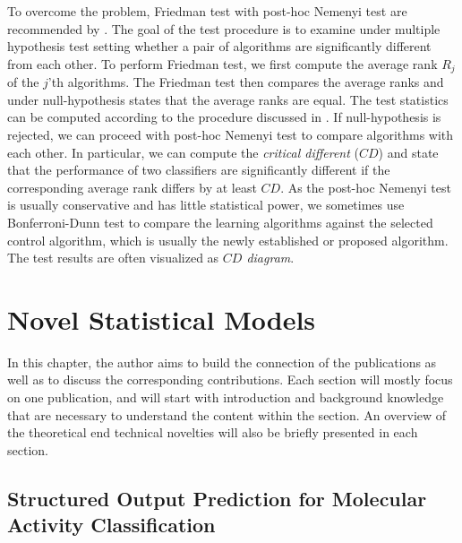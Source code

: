{%
To overcome the problem, Friedman test \citep{Friedman37the,Friedman40Comparison} with post-hoc Nemenyi test \citep{Nemenyi63distribution} are recommended by \citet{Demsar06statistical}.
The goal of the test procedure is to examine under multiple hypothesis test setting whether a pair of algorithms are significantly different from each other.
To perform Friedman test, we first compute the average rank $R_j$ of the $j$'th algorithms.
The Friedman test then compares the average ranks and under null-hypothesis states that the average ranks are equal.
The test statistics can be computed according to the procedure discussed in \citep{Demsar06statistical}.
If null-hypothesis is rejected, we can proceed with post-hoc Nemenyi test to compare algorithms with each other.
In particular, we can compute the \textit{critical different} ($CD$) and state that the performance of two classifiers are significantly different if the corresponding average rank differs by at least $CD$.
As the post-hoc Nemenyi test is usually conservative and has little statistical power, we sometimes use Bonferroni-Dunn test \citep{Dunn61mulitple} to compare the learning algorithms against the selected control algorithm, which is usually the newly established or proposed algorithm.
The test results are often visualized as \textit{$CD$ diagram}.














%
%
\chapter{Novel Statistical Models}\label{ch_models}

In this chapter, the author aims to build the connection of the publications as well as to discuss the corresponding contributions.
Each section will mostly focus on one publication, and will start with introduction and background knowledge that are necessary to understand the content within the section.
An overview of the theoretical end technical novelties will also be briefly presented in each section.

\section{Structured Output Prediction for Molecular Activity Classification}\label{sc_su10}

}
